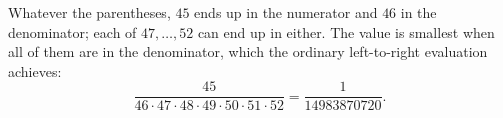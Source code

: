 Whatever the parentheses, $45$ ends up in the numerator and $46$ in the denominator; each of $47,\dots,52$ can end up in either. The value is smallest when all of them are in the denominator, which the ordinary left-to-right evaluation achieves:
\[\dfrac{45}{46\cdot47\cdot48\cdot49\cdot50\cdot51\cdot52}=\boxed{\dfrac1{14983870720}}.\]
